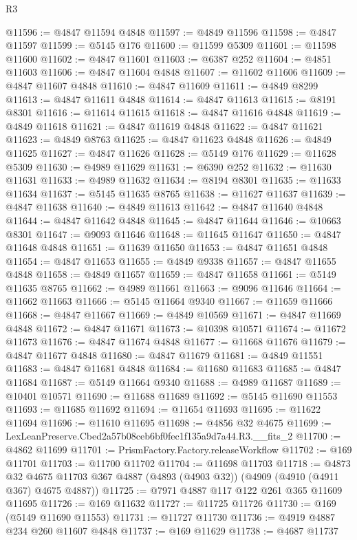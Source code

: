 \begin{lexlean}{R3}
\begin{coremodule}
@11596 := @4847 @11594 @4848
@11597 := @4849 @11596
@11598 := @4847 @11597
@11599 := @5145 @176
@11600 := @11599 @5309
@11601 := @11598 @11600
@11602 := @4847 @11601
@11603 := @6387 @252
@11604 := @4851 @11603
@11606 := @4847 @11604 @4848
@11607 := @11602 @11606
@11609 := @4847 @11607 @4848
@11610 := @4847 @11609
@11611 := @4849 @8299
@11613 := @4847 @11611 @4848
@11614 := @4847 @11613
@11615 := @8191 @8301
@11616 := @11614 @11615
@11618 := @4847 @11616 @4848
@11619 := @4849 @11618
@11621 := @4847 @11619 @4848
@11622 := @4847 @11621
@11623 := @4849 @8763
@11625 := @4847 @11623 @4848
@11626 := @4849 @11625
@11627 := @4847 @11626
@11628 := @5149 @176
@11629 := @11628 @5309
@11630 := @4989 @11629
@11631 := @6390 @252
@11632 := @11630 @11631
@11633 := @4989 @11632
@11634 := @8194 @8301
@11635 := @11633 @11634
@11637 := @5145 @11635 @8765
@11638 := @11627 @11637
@11639 := @4847 @11638
@11640 := @4849 @11613
@11642 := @4847 @11640 @4848
@11644 := @4847 @11642 @4848
@11645 := @4847 @11644
@11646 := @10663 @8301
@11647 := @9093 @11646
@11648 := @11645 @11647
@11650 := @4847 @11648 @4848
@11651 := @11639 @11650
@11653 := @4847 @11651 @4848
@11654 := @4847 @11653
@11655 := @4849 @9338
@11657 := @4847 @11655 @4848
@11658 := @4849 @11657
@11659 := @4847 @11658
@11661 := @5149 @11635 @8765
@11662 := @4989 @11661
@11663 := @9096 @11646
@11664 := @11662 @11663
@11666 := @5145 @11664 @9340
@11667 := @11659 @11666
@11668 := @4847 @11667
@11669 := @4849 @10569
@11671 := @4847 @11669 @4848
@11672 := @4847 @11671
@11673 := @10398 @10571
@11674 := @11672 @11673
@11676 := @4847 @11674 @4848
@11677 := @11668 @11676
@11679 := @4847 @11677 @4848
@11680 := @4847 @11679
@11681 := @4849 @11551
@11683 := @4847 @11681 @4848
@11684 := @11680 @11683
@11685 := @4847 @11684
@11687 := @5149 @11664 @9340
@11688 := @4989 @11687
@11689 := @10401 @10571
@11690 := @11688 @11689
@11692 := @5145 @11690 @11553
@11693 := @11685 @11692
@11694 := @11654 @11693
@11695 := @11622 @11694
@11696 := @11610 @11695
@11698 := @4856 @32 @4675
@11699 := LexLeanPreserve.Cbed2a57b08ceb6bf0fec1f135a9d7a44.R3.__fits_2
@11700 := @4862 @11699
@11701 := PrismFactory.Factory.releaseWorkflow
@11702 := @169 @11701
@11703 := @11700 @11702
@11704 := @11698 @11703
@11718 := @4873
    @32
    @4675
    @11703
    @367
    @4887
    (@4893 (@4903 @32))
    (@4909 (@4910 (@4911 @367) @4675 @4887))
@11725 := @7971 @4887 @117 @122 @261 @365 @11609 @11695
@11726 := @169 @11632
@11727 := @11725 @11726
@11730 := @169 (@5149 @11690 @11553)
@11731 := @11727 @11730
@11736 := @4919 @4887 @234 @260 @11607 @4848
@11737 := @169 @11629
@11738 := @4687 @11737

\end{coremodule}
\end{lexlean}
